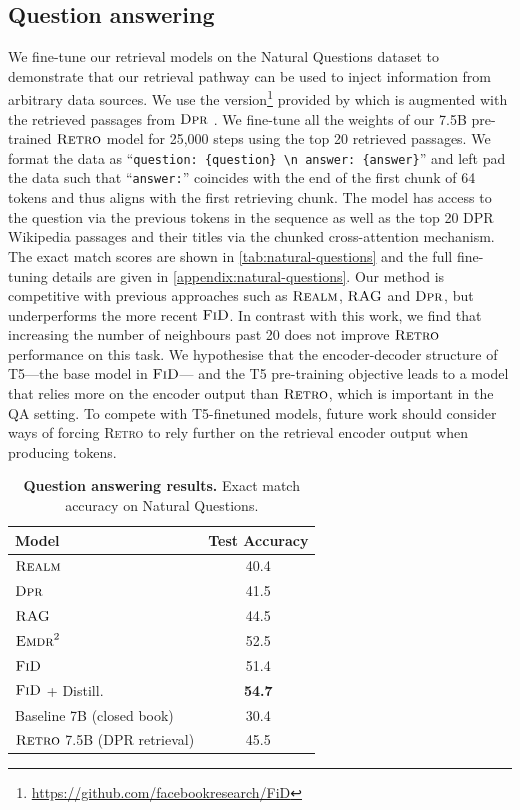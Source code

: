\documentclass[11pt, a4paper, logo]{deepmind}
\newcommand{\dpr}{\textsc{Dpr}}
\newcommand{\rag}{\textsc{RAG}}
\newcommand{\realm}{\textsc{Realm}}
\newcommand{\fid}{\textsc{FiD}}
\newcommand{\emdr}{\textsc{Emdr}^2}
\newcommand{\retro}{\textsc{Retro}\xspace}
\begin{document}
\subsection{Question answering}
\label{subsection-qa}
We fine-tune our retrieval models on the Natural Questions \citep{naturalquestions} dataset to demonstrate that our retrieval pathway can be used to inject information from arbitrary data sources.
We use the version\footnote{\url{https://github.com/facebookresearch/FiD}} provided by \cite{izacard2020leveraging} which is augmented with the retrieved passages from $\dpr$ \citep{karpukhin2020dense}.
We fine-tune all the weights of our 7.5B pre-trained $\retro$ model for 25,000 steps using the top 20 retrieved passages. 
We format the data as  ``\texttt{question: \{question\} \textbackslash{}n\,answer: \{answer\}}'' and left pad the data such that ``\texttt{answer:}'' coincides with the end of the first chunk of 64 tokens and thus aligns with the first retrieving chunk. The model has access to the question via the previous tokens in the sequence as well as the top 20 DPR Wikipedia passages and their titles via the chunked cross-attention mechanism. The exact match scores are shown in \autoref{tab:natural-questions} and the full fine-tuning details are given in \autoref{appendix:natural-questions}.
Our method is competitive with previous approaches such as $\realm$, $\rag$ and $\dpr$, but underperforms the more recent $\fid$. In contrast with this work, we find that increasing the number of neighbours past 20 does not improve $\retro$ performance on this task. We hypothesise that the encoder-decoder structure of T5---the base model in $\fid$--- and the T5 pre-training objective leads to a model that relies more on the encoder output than $\retro$, which is important in the QA setting. To compete with T5-finetuned models, future work should consider ways of forcing \retro to rely further on the retrieval encoder output when producing tokens.

\begin{table}[b]
    \caption{\textbf{Question answering results.} Exact match accuracy on Natural Questions.}
    \small
    \begin{center}
    \begin{tabular}{l c}
    Model & Test Accuracy\\ [0.5ex] 
    \toprule
    $\realm$ \citep{guu2020retrieval}    & 40.4 \\
    $\dpr$ \citep{karpukhin2020dense}    & 41.5 \\
    $\rag$ \citep{lewis2020retrieval}    & 44.5 \\
    $\emdr$ \citep{emdr}                 & 52.5 \\
    $\fid$ \citep{izacard2020leveraging} & 51.4 \\
    $\fid$ + Distill. \citep{izacard2020memory} & \textbf{54.7} \\
    \midrule
     Baseline 7B (closed book)         & 30.4 \\
     $\retro$ 7.5B (DPR retrieval)       & 45.5 \\
    \end{tabular}
    \end{center}
    \label{tab:natural-questions}
\end{table}
\end{document}
